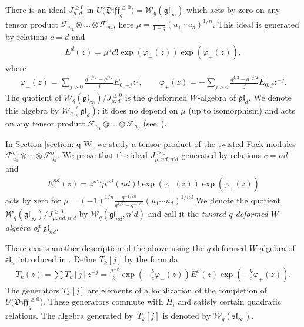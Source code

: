 \documentclass[pdftex]{sigma}
\numberwithin{equation}{section}
\theoremstyle{definition}
\newcommand{\qD}{\mathfrak{Diff}_q}
\begin{document}
There is an ideal $J_{\mu,d}^{\geqslant0}$ in $U\big(\qD^{\geqslant0}\big)=\mathcal{W}_q(\mathfrak{gl}_\infty)$ which acts by zero on any tensor product $\mathcal{F}_{u_1}\otimes \dots\otimes \mathcal{F}_{u_d}$, here $\mu= \frac{1}{1-q} (u_1 \cdots u_d)^{{1}/{n}}$. This ideal is generated by relations $c=d$ and
\begin{gather*}
E^d(z)= {\mu^d}{d!} \exp ( \varphi_- (z) ) \exp ( \varphi_+ (z) ),
\end{gather*}
where \begin{gather*}\varphi_{-} (z) = \sum_{j>0} \frac{q^{-j/2}-q^{j/2}}{j} E_{0,-j} z^j,\qquad \varphi_{+} (z) = - \sum_{j>0} \frac{q^{j/2}-q^{-j/2}}{j} E_{0,j} z^{-j}.\end{gather*}
The quotient of $\mathcal{W}_q(\mathfrak{gl}_{\infty})/J_{\mu,d}^{\geqslant0}$ is the $q$-deformed $W$-algebra of $\mathfrak{gl}_d$. We denote this algebra by $\mathcal{W}_q(\mathfrak{gl}_d)$; it does no depend on $\mu$ (up to isomorphism) and acts on any tensor product $\mathcal{F}_{u_1}\otimes \dots\otimes \mathcal{F}_{u_d}$ (see~\cite{FHSSY,N16}).

In Section \ref{section: q-W} we study a tensor product of the twisted Fock modules ${\mathcal{F}^{\sigma}_{u_1} \otimes \cdots \otimes \mathcal{F}_{u_d}^{\sigma}}$. We prove that the ideal $J_{\mu,nd,n'd}^{\geqslant0}$ generated by relations $c=nd$ and
\begin{gather*}E^{nd}(z)= z^{n'd} {\mu^{nd}}{(nd)!} \exp ( \varphi_- (z) ) \exp ( \varphi_+ (z) )\end{gather*} acts by zero for
$\mu = (-1)^{{1}/{n}} \frac{q^{-{1}/{2n}}}{q^{1/2}-q^{-1/2}} (u_1 \cdots u_d)^{{1}/{nd}}$.We denote the quotient $\mathcal{W}_q(\mathfrak{gl}_{\infty})/J_{\mu,nd,n'd}^{\geqslant0}$ by $\mathcal{W}_q(\mathfrak{gl}_{nd},n'd)$ and call it the \emph{twisted $q$-deformed $W$-algebra of $\mathfrak{gl}_{nd}$}.

There exists another description of the above using the $q$-deformed $W$-algebra of $\mathfrak{sl}_n$ introduced in \cite{FF}. Define $T_k[j]$ by the formula
\begin{gather*}
T_k (z) =\sum T_k[j] z^{-j} = \frac{\mu^{-k}}{k!} \exp \left(-\frac{k}{c} \varphi_- (z) \right) E^k (z) \exp \left( - \frac{k}{c} \varphi_+ (z) \right).
\end{gather*}
The generators $T_k[j]$ are elements of a localization of the completion of $U\big(\qD^{\geqslant0}\big)$. These generators commute with $H_i$ and satisfy certain quadratic relations. The algebra generated by~$T_k[j]$ is denoted by $\mathcal{W}_q(\mathfrak{sl}_{\infty})$.
\end{document}
